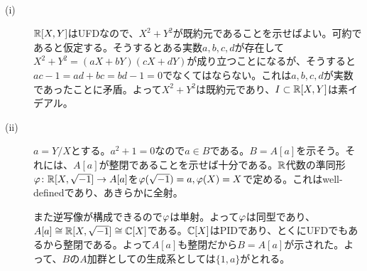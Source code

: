 
\begin{sol} ${}$
  \begin{description}
    \item[(i)] ${\mathbb R}[X,Y]$はUFDなので、$X^2 + Y^2$が既約元であることを示せばよい。可約であると仮定する。そうするとある実数$a,b,c,d $が存在して$X^2 + Y^2 = (aX + bY)(cX + dY)$が成り立つことになるが、そうすると$ac - 1 = ad + bc = bd - 1 = 0$でなくてはならない。これは$a,b,c,d$が実数であったことに矛盾。よって$X^2 + Y^2$は既約元であり、$I \subset {\mathbb R}[X,Y]$は素イデアル。
    \item[(ii)] $a = Y/X$とする。$a^2 + 1 = 0$なので$a \in B$である。$B = A[a]$を示そう。それには、$A[a]$が整閉であることを示せば十分である。${\mathbb R}$代数の準同形${\varphi} \colon {\mathbb R}[X,\sqrt{-1}] \to A[a]$を${\varphi}(\sqrt{-1})=a, {\varphi}(X)=X$で定める。これはwell-definedであり、あきらかに全射。

    また逆写像が構成できるので${\varphi}$は単射。よって${\varphi}$は同型であり、$A[a] \cong {\mathbb R}[X,\sqrt{-1}] \cong {\mathbb C}[X]$である。${\mathbb C}[X]$はPIDであり、とくにUFDでもあるから整閉である。よって$A[a]$も整閉だから$B = A[a]$が示された。よって、$B$の$A$加群としての生成系としては$\{ 1, a \}$がとれる。
  \end{description}
\end{sol}


\newpage

